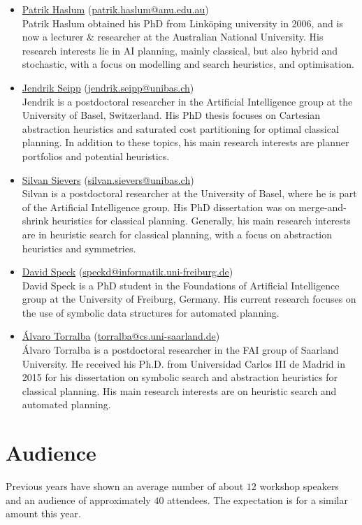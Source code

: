 \documentclass[10pt]{article}
\begin{document}
\begin{itemize}
\item \href{https://users.cecs.anu.edu.au/~patrik/}{Patrik Haslum}
(\href{mailto:patrik.haslum@anu.edu.au}{patrik.haslum@anu.edu.au})\\
Patrik Haslum obtained his PhD from Link\"oping university in 2006,
and is now a lecturer \& researcher at the Australian National
University. His research interests lie in AI planning, mainly classical,
but also hybrid and stochastic, with a focus on modelling and search
heuristics, and optimisation.

\item \href{https://ai.dmi.unibas.ch/people/seipp}{Jendrik Seipp}
(\href{mailto:jendrik.seipp@unibas.ch}{jendrik.seipp@unibas.ch})\\
Jendrik is a postdoctoral researcher in the Artificial Intelligence
group at the University of Basel, Switzerland. His PhD thesis focuses
on Cartesian abstraction heuristics and saturated cost partitioning
for optimal classical planning. In addition to these topics, his main
research interests are planner portfolios and potential heuristics.

\item \href{https://ai.dmi.unibas.ch/people/}{Silvan Sievers}
(\href{mailto:silvan.sievers@unibas.ch}{silvan.sievers@unibas.ch})\\
Silvan is a postdoctoral researcher at the University of Basel, where he is
part of the Artificial Intelligence group. His PhD dissertation was on
merge-and-shrink heuristics for classical planning. Generally, his main
research interests are in heuristic search for classical planning, with a focus
on abstraction heuristics and symmetries.

\item \href{http://}{David Speck}
(\href{mailto:speckd@informatik.uni-freiburg.de}{speckd@informatik.uni-freiburg.de})\\
David Speck is a PhD student in the Foundations of Artificial Intelligence
group at the University of Freiburg, Germany. His current research focuses on
the use of symbolic data structures for automated planning.

\item \href{http://}{{\'A}lvaro Torralba}
  (\href{mailto:torralba@cs.uni-saarland.de}{torralba@cs.uni-saarland.de})\\
  \'Alvaro Torralba is a postdoctoral researcher in the FAI group of Saarland
  University. He received his Ph.D. from Universidad Carlos III de Madrid in 2015 for his
  dissertation on symbolic search and abstraction heuristics for classical planning. His
  main research interests are on heuristic search and automated planning.


\end{itemize}

\section*{Audience}
Previous years have shown an average number of about $12$ workshop
speakers and an audience of approximately $40$ attendees. The
expectation is for a similar amount this year.
\end{document}
